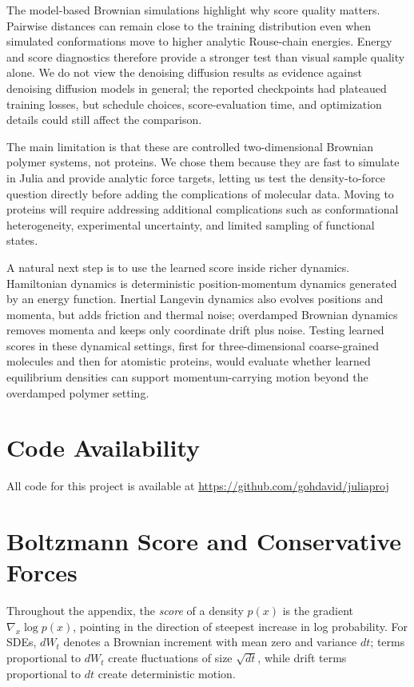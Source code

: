 \documentclass[reprint,amsmath,amssymb,aps,pra,10pt]{revtex4-2}
\begin{document}
The model-based Brownian simulations highlight why score quality matters.
Pairwise distances can remain close to the training distribution even when simulated conformations move to higher analytic Rouse-chain energies.
Energy and score diagnostics therefore provide a stronger test than visual sample quality alone.
We do not view the denoising diffusion results as evidence against denoising diffusion models in general; the reported checkpoints had plateaued training losses, but schedule choices, score-evaluation time, and optimization details could still affect the comparison.

The main limitation is that these are controlled two-dimensional Brownian polymer systems, not proteins.
We chose them because they are fast to simulate in Julia and provide analytic force targets, letting us test the density-to-force question directly before adding the complications of molecular data.
Moving to proteins will require addressing additional complications such as conformational heterogeneity, experimental uncertainty, and limited sampling of functional states.

A natural next step is to use the learned score inside richer dynamics.
Hamiltonian dynamics is deterministic position-momentum dynamics generated by an energy function.
Inertial Langevin dynamics also evolves positions and momenta, but adds friction and thermal noise; overdamped Brownian dynamics removes momenta and keeps only coordinate drift plus noise.
Testing learned scores in these dynamical settings, first for three-dimensional coarse-grained molecules and then for atomistic proteins, would evaluate whether learned equilibrium densities can support momentum-carrying motion beyond the overdamped polymer setting.

\section{Code Availability}

All code for this project is available at \href{https://github.com/gohdavid/juliaproj}{https://github.com/gohdavid/juliaproj}


\appendix
\clearpage

\section{Boltzmann Score and Conservative Forces}

Throughout the appendix, the \emph{score} of a density $p(x)$ is the gradient $\nabla_x\log p(x)$, pointing in the direction of steepest increase in log probability.
For SDEs, $dW_t$ denotes a Brownian increment with mean zero and variance $dt$; terms proportional to $dW_t$ create fluctuations of size $\sqrt{dt}$, while drift terms proportional to $dt$ create deterministic motion.
\end{document}
